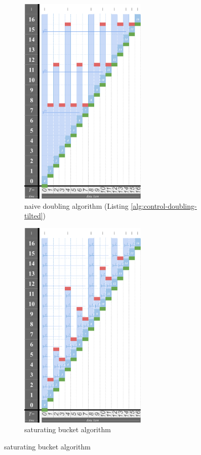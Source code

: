 \begin{figure}
\begin{subfigure}{0.36\linewidth}
\centering
\includegraphics[height=4in]{img/surface-control-tall-zhao-tilted-doubling-naive}
\centering
\caption{naive doubling algorithm (Listing \ref{alg:control-doubling-tilted})}
\label{fig:surface-control-tilted:naive-doubling}
\end{subfigure}%
\begin{subfigure}{0.32\linewidth}
\centering
\includegraphics[height=4in,trim={2.5cm 0 0 0},clip]{img/surface-control-tall-zhao}
\centering
\caption{saturating bucket algorithm \citep{zhao2005generalized}}
\label{fig:surface-control-tilted:pyrimidal}

\end{subfigure}
\end{figure}
